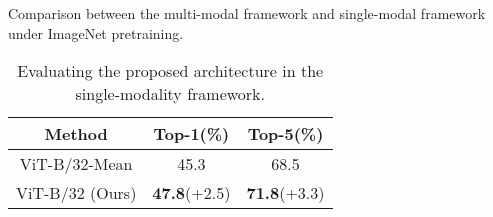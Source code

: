 \documentclass[runningheads]{llncs}
\begin{document}
\begin{table}[tb!]
\renewcommand{\arraystretch}{1.0}
    \centering
    \caption{Comparison between the multi-modal framework and single-modal framework under ImageNet pretraining.}
    \hfill
    \label{tab:alignment}
\vspace{-0.8cm}
\end{table}
 \begin{table}[tb!]
\center
\caption{Evaluating the proposed architecture in the single-modality framework.}

\begin{tabular}{c|cc}
  \toprule
  Method & Top-1(\%) & Top-5(\%) \\
  \midrule
  ViT-B/32-Mean & 45.3 & 68.5 \\
  ViT-B/32 (Ours) & \textbf{47.8}\scriptsize(+2.5) & \textbf{71.8}\scriptsize(+3.3) \\
  \bottomrule
\end{tabular}

\label{tab:simple}

\end{table} 
\end{document}

